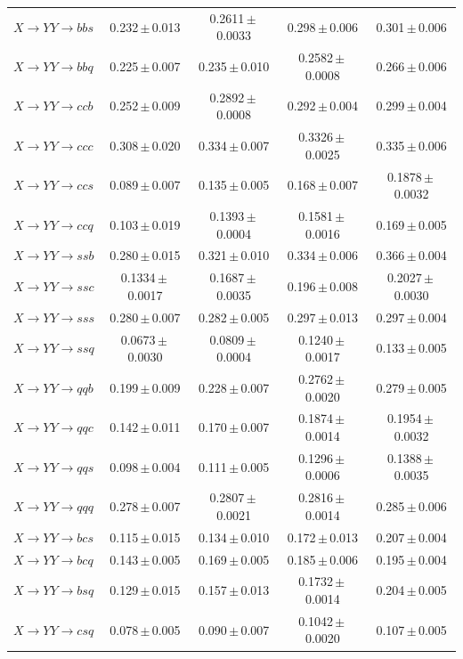 \documentclass[12pt]{article}   %
\begin{document}
\begin{landscape}
{\begin{longtable}{@{\extracolsep{\fill}}lcccc@{}}
$X\to YY\to bbs$ & 0.232\,$\pm$\,0.013 & 0.2611\,$\pm$\,0.0033 & 0.298\,$\pm$\,0.006 & 0.301\,$\pm$\,0.006 \\
$X\to YY\to bbq$ & 0.225\,$\pm$\,0.007 & 0.235\,$\pm$\,0.010 & 0.2582\,$\pm$\,0.0008 & 0.266\,$\pm$\,0.006 \\
$X\to YY\to ccb$ & 0.252\,$\pm$\,0.009 & 0.2892\,$\pm$\,0.0008 & 0.292\,$\pm$\,0.004 & 0.299\,$\pm$\,0.004 \\
$X\to YY\to ccc$ & 0.308\,$\pm$\,0.020 & 0.334\,$\pm$\,0.007 & 0.3326\,$\pm$\,0.0025 & 0.335\,$\pm$\,0.006 \\
$X\to YY\to ccs$ & 0.089\,$\pm$\,0.007 & 0.135\,$\pm$\,0.005 & 0.168\,$\pm$\,0.007 & 0.1878\,$\pm$\,0.0032 \\
$X\to YY\to ccq$ & 0.103\,$\pm$\,0.019 & 0.1393\,$\pm$\,0.0004 & 0.1581\,$\pm$\,0.0016 & 0.169\,$\pm$\,0.005 \\
$X\to YY\to ssb$ & 0.280\,$\pm$\,0.015 & 0.321\,$\pm$\,0.010 & 0.334\,$\pm$\,0.006 & 0.366\,$\pm$\,0.004 \\
$X\to YY\to ssc$ & 0.1334\,$\pm$\,0.0017 & 0.1687\,$\pm$\,0.0035 & 0.196\,$\pm$\,0.008 & 0.2027\,$\pm$\,0.0030 \\
$X\to YY\to sss$ & 0.280\,$\pm$\,0.007 & 0.282\,$\pm$\,0.005 & 0.297\,$\pm$\,0.013 & 0.297\,$\pm$\,0.004 \\
$X\to YY\to ssq$ & 0.0673\,$\pm$\,0.0030 & 0.0809\,$\pm$\,0.0004 & 0.1240\,$\pm$\,0.0017 & 0.133\,$\pm$\,0.005 \\
$X\to YY\to qqb$ & 0.199\,$\pm$\,0.009 & 0.228\,$\pm$\,0.007 & 0.2762\,$\pm$\,0.0020 & 0.279\,$\pm$\,0.005 \\
$X\to YY\to qqc$ & 0.142\,$\pm$\,0.011 & 0.170\,$\pm$\,0.007 & 0.1874\,$\pm$\,0.0014 & 0.1954\,$\pm$\,0.0032 \\
$X\to YY\to qqs$ & 0.098\,$\pm$\,0.004 & 0.111\,$\pm$\,0.005 & 0.1296\,$\pm$\,0.0006 & 0.1388\,$\pm$\,0.0035 \\
$X\to YY\to qqq$ & 0.278\,$\pm$\,0.007 & 0.2807\,$\pm$\,0.0021 & 0.2816\,$\pm$\,0.0014 & 0.285\,$\pm$\,0.006 \\
$X\to YY\to bcs$ & 0.115\,$\pm$\,0.015 & 0.134\,$\pm$\,0.010 & 0.172\,$\pm$\,0.013 & 0.207\,$\pm$\,0.004 \\
$X\to YY\to bcq$ & 0.143\,$\pm$\,0.005 & 0.169\,$\pm$\,0.005 & 0.185\,$\pm$\,0.006 & 0.195\,$\pm$\,0.004 \\
$X\to YY\to bsq$ & 0.129\,$\pm$\,0.015 & 0.157\,$\pm$\,0.013 & 0.1732\,$\pm$\,0.0014 & 0.204\,$\pm$\,0.005 \\
$X\to YY\to csq$ & 0.078\,$\pm$\,0.005 & 0.090\,$\pm$\,0.007 & 0.1042\,$\pm$\,0.0020 & 0.107\,$\pm$\,0.005 \\

\end{longtable}}
\end{landscape}
\end{document}
